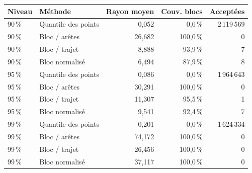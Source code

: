 \begin{tabular}{@{}llrrr@{}}
\toprule
Niveau & Méthode & Rayon moyen & Couv. blocs & Acceptées\\
\midrule
90\,\% & Quantile des points & 0,052 & 0,0\,\% & 2\,119\,569\\
90\,\% & Bloc / arêtes & 26,682 & 100,0\,\% & 0\\
90\,\% & Bloc / trajet & 8,888 & 93,9\,\% & 7\\
90\,\% & Bloc normalisé & 6,494 & 87,9\,\% & 8\\
95\,\% & Quantile des points & 0,086 & 0,0\,\% & 1\,964\,643\\
95\,\% & Bloc / arêtes & 30,291 & 100,0\,\% & 0\\
95\,\% & Bloc / trajet & 11,307 & 95,5\,\% & 1\\
95\,\% & Bloc normalisé & 9,541 & 92,4\,\% & 7\\
99\,\% & Quantile des points & 0,201 & 0,0\,\% & 1\,624\,334\\
99\,\% & Bloc / arêtes & 74,172 & 100,0\,\% & 0\\
99\,\% & Bloc / trajet & 26,456 & 100,0\,\% & 0\\
99\,\% & Bloc normalisé & 37,117 & 100,0\,\% & 0\\
\bottomrule
\end{tabular}
